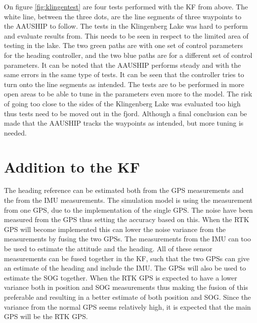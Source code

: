 On figure \ref{fig:klingentest} are four tests performed with the \ac{KF} from above. The white line, between the three dots, are the line segments of three waypoints to the AAUSHIP to follow. The tests in the Klingenberg Lake was hard to perform and evaluate results from. This needs to be seen in respect to the limited area of testing in the lake. The two green paths are with one set of control parameters for the heading controller, and the two blue paths are for a different set of control parameters. It can be noted that the AAUSHIP performs steady and with the same errors in the same type of tests. It can be seen that the controller tries to turn onto the line segments as intended. The tests are to be performed in more open areas to be able to tune in the parameters even more to the model. The risk of going too close to the sides of the Klingenberg Lake was evaluated too high thus tests need to be moved out in the fjord. Although a final conclusion can be made that the AAUSHIP tracks the waypoints as intended, but more tuning is needed.

\section{Addition to the \acl{KF}}
The heading reference can be estimated both from the \ac{GPS} measurements and the from the \ac{IMU} measurements. The simulation model is using the measurement from one \ac{GPS}, due to the implementation of the single \ac{GPS}. The noise have been measured from the \ac{GPS} thus setting the accuracy based on this. When the \ac{RTK} \ac{GPS} will become implemented this can lower the noise variance from the measurements by fusing the two \ac{GPS}s. The measurements from the \ac{IMU} can too be used to estimate the attitude and the heading. All of these sensor measurements can be fused together in the \ac{KF}, such that the two \ac{GPS}s can give an estimate of the heading and include the \ac{IMU}. The \ac{GPS}s will also be used to estimate the \ac{SOG} together. When the \ac{RTK} \ac{GPS} is expected to have a lower variance both in position and \ac{SOG} measurements thus making the fusion of this preferable and resulting in a better estimate of both position and \ac{SOG}. Since the variance from the normal \ac{GPS} seems relatively high, it is expected that the main \ac{GPS} will be the \ac{RTK} \ac{GPS}.



